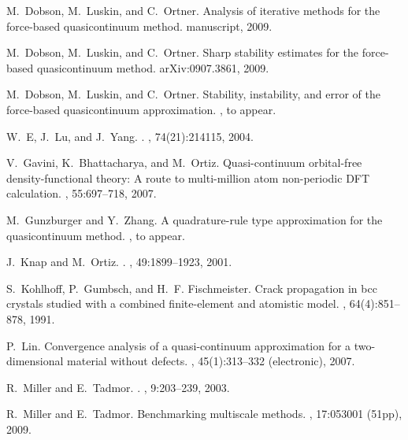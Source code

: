 \documentclass[12pt,reqno]{amsart}
\begin{document}
\begin{thebibliography}{10}
M.~Dobson, M.~Luskin, and C.~Ortner.
\newblock Analysis of iterative methods for the force-based quasicontinuum
  method.
\newblock manuscript, 2009.

M.~Dobson, M.~Luskin, and C.~Ortner.
\newblock Sharp stability estimates for the force-based quasicontinuum method.
\newblock arXiv:0907.3861, 2009.

M.~Dobson, M.~Luskin, and C.~Ortner.
\newblock Stability, instability, and error of the force-based quasicontinuum
  approximation.
, to appear.

W.~E, J.~Lu, and J.~Yang.
.
, 74(21):214115, 2004.

V.~Gavini, K.~Bhattacharya, and M.~Ortiz.
\newblock Quasi-continuum orbital-free density-functional theory: A route to
  multi-million atom non-periodic {DFT} calculation.
, 55:697--718, 2007.

M.~Gunzburger and Y.~Zhang.
\newblock A quadrature-rule type approximation for the quasicontinuum method.
, to appear.

J.~Knap and M.~Ortiz.
.
, 49:1899--1923, 2001.

S.~Kohlhoff, P.~Gumbsch, and H.~F. Fischmeister.
\newblock Crack propagation in bcc crystals studied with a combined
  finite-element and atomistic model.
, 64(4):851--878, 1991.

P.~Lin.
\newblock Convergence analysis of a quasi-continuum approximation for a
  two-dimensional material without defects.
, 45(1):313--332 (electronic), 2007.

R.~Miller and E.~Tadmor.
.
, 9:203--239, 2003.

R.~Miller and E.~Tadmor.
\newblock Benchmarking multiscale methods.
,
  17:053001 (51pp), 2009.


\end{thebibliography}
\end{document}
